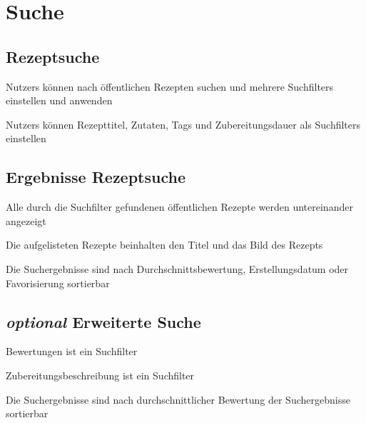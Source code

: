 \section{Suche}

	\subsection{Rezeptsuche}
	
		\Glspl{Nutzer} können nach öffentlichen Rezepten suchen und mehrere \glspl{Suchfilter} einstellen und anwenden
		
		\Glspl{Nutzer} können Rezepttitel, Zutaten, \glspl{Tag} und Zubereitungsdauer als \glspl{Suchfilter} einstellen

			
	\subsection{Ergebnisse Rezeptsuche}
	
		Alle durch die \gls{Suchfilter} gefundenen öffentlichen Rezepte werden untereinander angezeigt
		
		Die aufgelisteten Rezepte beinhalten den Titel und das Bild des Rezepts
		
	
		Die Suchergebnisse sind nach Durchschnittsbewertung, Erstellungsdatum oder Favorisierung sortierbar
	
	
	\subsection{{\em optional} Erweiterte Suche}
		
		Bewertungen ist ein \gls{Suchfilter}
		
		Zubereitungsbeschreibung ist ein \gls{Suchfilter}
		
		Die Suchergebnisse sind nach durchschnittlicher Bewertung der Suchergebnisse sortierbar
	
